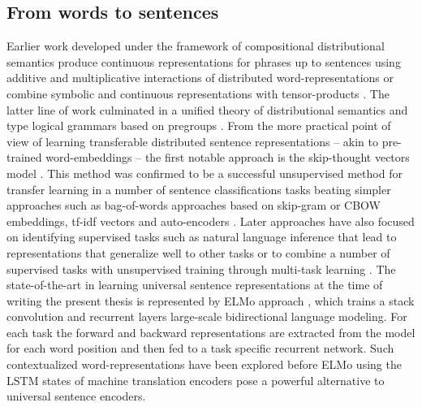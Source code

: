 \subsection{From words to sentences}
Earlier work developed under the framework of compositional distributional semantics produce continuous representations for phrases up to sentences using additive and multiplicative interactions of distributed word-representations \cite{mitchell2008vector} or combine symbolic and continuous representations with tensor-products \cite{clark2007combining}. The latter line of work culminated in a unified theory of distributional semantics and type logical grammars based on pregroups \cite{coecke2010mathematical}. 
From the more practical point of view of learning transferable distributed sentence representations -- akin to pre-trained word-embeddings -- the first notable approach is the skip-thought vectors model \cite{kiros2015skip}.   
This method was confirmed to be a successful unsupervised method for transfer learning in a number of sentence classifications tasks beating simpler approaches such as bag-of-words approaches based on skip-gram or CBOW embeddings, tf-idf vectors and auto-encoders \cite{hill2016learning}. 
Later approaches have also focused on identifying supervised tasks such as natural language inference \cite{conneau-EtAl:2017:EMNLP2017} that lead to representations that generalize well to other tasks or to combine a number of supervised tasks with unsupervised training through multi-task learning \cite{subramanian2018learning}. The state-of-the-art in learning universal sentence representations at the time of writing the present thesis is represented by ELMo approach \cite{peters2018deep}, which trains a stack convolution and recurrent layers large-scale bidirectional language modeling. For each task the forward and backward representations are extracted from the model for each word position and then fed to a task specific recurrent network. Such contextualized word-representations have been explored before ELMo using the LSTM states of machine translation encoders \cite{mccann2017learned} pose a powerful alternative to universal sentence encoders. 

